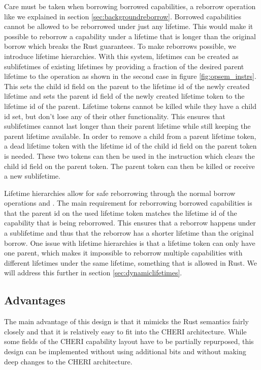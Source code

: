 Care must be taken when borrowing borrowed capabilities, a reborrow operation like we explained in section \ref{sec:backgroundreborrow}.
Borrowed capabilities cannot be allowed to be reborrowed under just any lifetime.
This would make it possible to reborrow a capability under a lifetime that is longer than the original borrow which breaks the Rust guarantees.
To make reborrows possible, we introduce lifetime hierarchies.
With this system, lifetimes can be created as sublifetimes of existing lifetimes by providing a fraction of the desired parent lifetime to the  operation as shown in the second case in figure \ref{fig:opsem_instrs}.
This sets the child id field on the parent to the lifetime id of the newly created lifetime and sets the parent id field of the newly created lifetime token to the lifetime id of the parent.
Lifetime tokens cannot be killed while they have a child id set, but don't lose any of their other functionality.
This ensures that sublifetimes cannot last longer than their parent lifetime while still keeping the parent lifetime available.
In order to remove a child from a parent lifetime token, a dead lifetime token with the lifetime id of the child id field on the parent token is needed.
These two tokens can then be used in the  instruction which clears the child id field on the parent token.
The parent token can then be killed or receive a new sublifetime.

Lifetime hierarchies allow for safe reborrowing through the normal borrow operations  and .
The main requirement for reborrowing borrowed capabilities is that the parent id on the used lifetime token matches the lifetime id of the capability that is being reborrowed.
This ensures that a reborrow happens under a sublifetime and thus that the reborrow has a shorter lifetime than the original borrow.
One issue with lifetime hierarchies is that a lifetime token can only have one parent, which makes it impossible to reborrow multiple capabilities with different lifetimes under the same lifetime, something that is allowed in Rust.
We will address this further in section \ref{sec:dynamiclifetimes}.

\subsection{Advantages}
The main advantage of this design is that it mimicks the Rust semantics fairly closely and that it is relatively easy to fit into the CHERI architecture. While some fields of the CHERI capability layout have to be partially repurposed, this design can be implemented without using additional bits and without making deep changes to the CHERI architecture.

